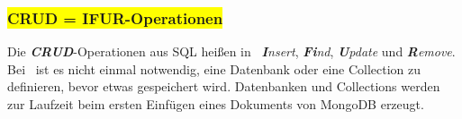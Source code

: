 %
%
%



\subsubsection{\colorbox{yellow}{CRUD = IFUR-Operationen}\label{ifur}}
Die \textit{\textbf{CRUD}}-Operationen aus SQL heißen in \mongo\ \textit{\textbf{I}nsert}, \textit{\textbf{Fi}nd}, \textit{\textbf{U}pdate} und \textit{\textbf{R}emove}. Bei \mongo\ ist es nicht einmal notwendig, eine Datenbank oder eine Collection zu definieren, bevor etwas gespeichert wird. Datenbanken und Collections werden zur Laufzeit beim ersten Einfügen eines Dokuments von MongoDB erzeugt.

